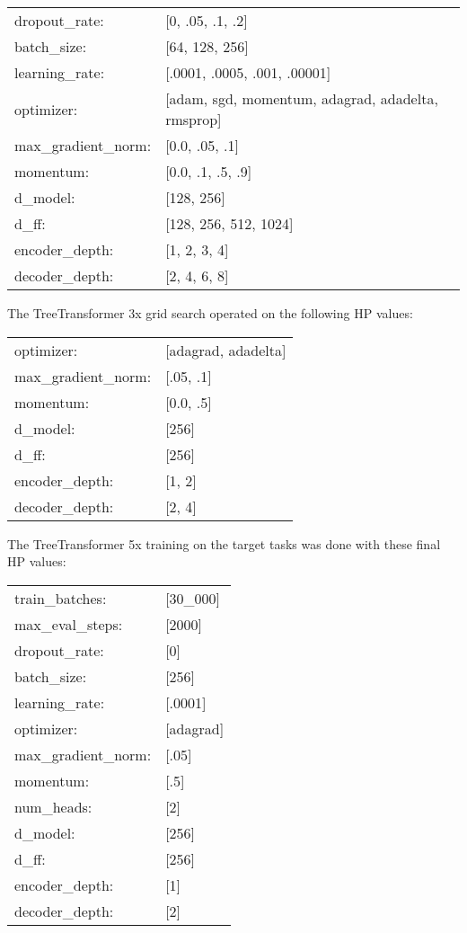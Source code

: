 \begin{tabular}{ll}
    dropout\_rate: & [0, .05, .1, .2] \\
    batch\_size: & [64, 128, 256] \\
    learning\_rate: & [.0001, .0005, .001, .00001] \\
    optimizer: & [adam, sgd, momentum, adagrad, adadelta, rmsprop] \\
    max\_gradient\_norm: & [0.0, .05, .1] \\
    momentum: & [0.0, .1, .5, .9] \\
    d\_model: & [128, 256] \\
    d\_ff: & [128, 256, 512, 1024] \\
    encoder\_depth: & [1, 2, 3, 4] \\
    decoder\_depth: & [2, 4, 6, 8] \\
    
\end{tabular}

\vskip 0.15in
The TreeTransformer 3x grid search operated on the following HP values: 

\begin{tabular}{ll}
    optimizer: & [adagrad, adadelta] \\
    max\_gradient\_norm: & [.05, .1] \\
    momentum: & [0.0, .5] \\
    d\_model: & [256] \\
    d\_ff: & [256] \\
    encoder\_depth: & [1, 2] \\
    decoder\_depth: & [2, 4] \\
\end{tabular}
\vskip 0.15in

The TreeTransformer 5x training on the target tasks was done with these final HP values:


\begin{tabular}{ll}
    train\_batches: & [30\_000]   \\
    max\_eval\_steps: & [2000] \\

    dropout\_rate: & [0] \\
    batch\_size: & [256] \\
    learning\_rate: & [.0001] \\
    optimizer: & [adagrad] \\
    max\_gradient\_norm: & [.05] \\
    momentum: & [.5] \\
    num\_heads: & [2] \\
    d\_model: & [256] \\
    d\_ff: & [256] \\
    encoder\_depth: & [1] \\
    decoder\_depth: & [2] \\
\end{tabular}

